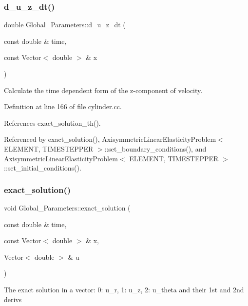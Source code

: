 \subsubsection{\texorpdfstring{d\+\_\+u\+\_\+z\+\_\+dt()}{d\_u\_z\_dt()}}
{\footnotesize\ttfamily double Global\+\_\+\+Parameters\+::d\+\_\+u\+\_\+z\+\_\+dt (\begin{DoxyParamCaption}\item[{const double \&}]{time,  }\item[{const Vector$<$ double $>$ \&}]{x }\end{DoxyParamCaption})}



Calculate the time dependent form of the z-\/component of velocity. 



Definition at line 166 of file cylinder.\+cc.



References exact\+\_\+solution\+\_\+th().



Referenced by exact\+\_\+solution(), Axisymmetric\+Linear\+Elasticity\+Problem$<$ E\+L\+E\+M\+E\+N\+T, T\+I\+M\+E\+S\+T\+E\+P\+P\+E\+R $>$\+::set\+\_\+boundary\+\_\+conditions(), and Axisymmetric\+Linear\+Elasticity\+Problem$<$ E\+L\+E\+M\+E\+N\+T, T\+I\+M\+E\+S\+T\+E\+P\+P\+E\+R $>$\+::set\+\_\+initial\+\_\+conditions().

\mbox{\label{namespaceGlobal__Parameters_a7da914d64b7a62d35793172f6a0fd712}} 
\subsubsection{\texorpdfstring{exact\+\_\+solution()}{exact\_solution()}}
{\footnotesize\ttfamily void Global\+\_\+\+Parameters\+::exact\+\_\+solution (\begin{DoxyParamCaption}\item[{const double \&}]{time,  }\item[{const Vector$<$ double $>$ \&}]{x,  }\item[{Vector$<$ double $>$ \&}]{u }\end{DoxyParamCaption})}

The exact solution in a vector\+: 0\+: u\+\_\+r, 1\+: u\+\_\+z, 2\+: u\+\_\+theta and their 1st and 2nd derivs 


